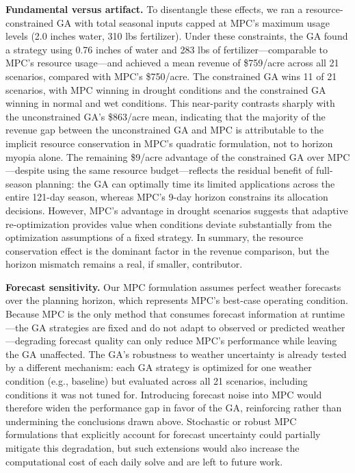 \documentclass[pdflatex,sn-mathphys-num]{sn-jnl}
\begin{document}
\textbf{Fundamental versus artifact.} To disentangle these effects, we ran a resource-constrained GA with total seasonal inputs capped at MPC's maximum usage levels (2.0 inches water, 310 lbs fertilizer). Under these constraints, the GA found a strategy using 0.76 inches of water and 283 lbs of fertilizer---comparable to MPC's resource usage---and achieved a mean revenue of \$759/acre across all 21 scenarios, compared with MPC's \$750/acre. The constrained GA wins 11 of 21 scenarios, with MPC winning in drought conditions and the constrained GA winning in normal and wet conditions. This near-parity contrasts sharply with the unconstrained GA's \$863/acre mean, indicating that the majority of the revenue gap between the unconstrained GA and MPC is attributable to the implicit resource conservation in MPC's quadratic formulation, not to horizon myopia alone. The remaining \$9/acre advantage of the constrained GA over MPC---despite using the same resource budget---reflects the residual benefit of full-season planning: the GA can optimally time its limited applications across the entire 121-day season, whereas MPC's 9-day horizon constrains its allocation decisions. However, MPC's advantage in drought scenarios suggests that adaptive re-optimization provides value when conditions deviate substantially from the optimization assumptions of a fixed strategy. In summary, the resource conservation effect is the dominant factor in the revenue comparison, but the horizon mismatch remains a real, if smaller, contributor.

\textbf{Forecast sensitivity.} Our MPC formulation assumes perfect weather forecasts over the planning horizon, which represents MPC's best-case operating condition. Because MPC is the only method that consumes forecast information at runtime---the GA strategies are fixed and do not adapt to observed or predicted weather---degrading forecast quality can only reduce MPC's performance while leaving the GA unaffected. The GA's robustness to weather uncertainty is already tested by a different mechanism: each GA strategy is optimized for one weather condition (e.g., baseline) but evaluated across all 21 scenarios, including conditions it was not tuned for. Introducing forecast noise into MPC would therefore widen the performance gap in favor of the GA, reinforcing rather than undermining the conclusions drawn above. Stochastic or robust MPC formulations that explicitly account for forecast uncertainty could partially mitigate this degradation, but such extensions would also increase the computational cost of each daily solve and are left to future work.
\end{document}
